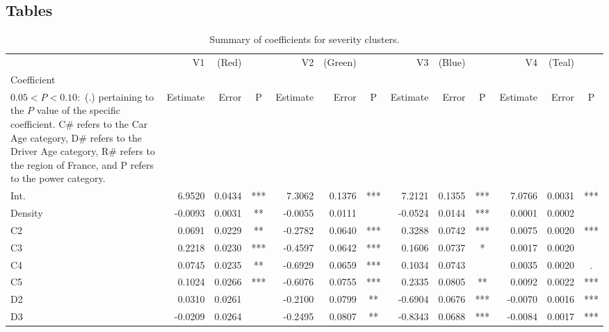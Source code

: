 \documentclass[11pt,letterpaper]{article}
\numberwithin{equation}{section}
\numberwithin{equation}{section}
\numberwithin{equation}{section}
\begin{document}
\begin{center}
\begin{table}

\section{Tables}\label{app:tables}

\caption{ Summary of coefficients for severity clusters.}
\label{severity_coef_table}
\begin{tabular}{|l|rrc|rrc|rrc|rrc|}
\hline\hline
         & V1         & (Red)     &    & V2         & (Green)   &    & V3          & (Blue)     &    & V4          & (Teal)     &    \\
Coefficient \footnote{The significance codes are defined as $  P < 0.001 : $  (***), $0.001 < P < 0.01:$ (**), $  0.01 < P < 0.05:$ (*),\\ $0.05 < P < 0.10 : $ (.) %
pertaining to the $P$ value of the specific coefficient. C\# refers to the Car Age category, D\# refers to the Driver Age category, R\# refers to the region of France, and P refers to the power category.  }      & Estimate   & Error     & P   & Estimate   & Error     & P   & Estimate    & Error      & P   & Estimate    & Error      & P   \\ \hline
Int.    & 6.9520  & 0.0434 & *** & 7.3062  & 0.1376 & *** & 7.2121  & 0.1355 & *** & 7.0766  & 0.0031 & *** \\
Density & -0.0093 & 0.0031 & **  & -0.0055 & 0.0111 &     & -0.0524 & 0.0144 & *** & 0.0001  & 0.0002 &     \\
C2      & 0.0691  & 0.0229 & **  & -0.2782 & 0.0640 & *** & 0.3288  & 0.0742 & *** & 0.0075  & 0.0020 & *** \\
C3      & 0.2218  & 0.0230 & *** & -0.4597 & 0.0642 & *** & 0.1606  & 0.0737 & *   & 0.0017  & 0.0020 &     \\
C4      & 0.0745  & 0.0235 & **  & -0.6929 & 0.0659 & *** & 0.1034  & 0.0743 &     & 0.0035  & 0.0020 & .   \\
C5      & 0.1024  & 0.0266 & *** & -0.6076 & 0.0755 & *** & 0.2335  & 0.0805 & **  & 0.0092  & 0.0022 & *** \\
D2      & 0.0310  & 0.0261 &     & -0.2100 & 0.0799 & **  & -0.6904 & 0.0676 & *** & -0.0070 & 0.0016 & *** \\
D3      & -0.0209 & 0.0264 &     & -0.2495 & 0.0807 & **  & -0.8343 & 0.0688 & *** & -0.0084 & 0.0017 & *** \\

\end{tabular}
\end{table}
\end{center}
\end{document}
